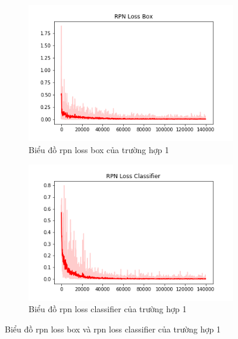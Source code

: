 \begin{center}
    \begin{figure}[H]
    \centering
    	\begin{subfigure}[H]{0.5\linewidth}
    		\centering
    		\includegraphics[width=\linewidth]{images/chap3/rpn_loss_box_2.png}
		    \caption{Biểu đồ rpn loss box của trường hợp 1}
		    \label{fig:my_label}
		\end{subfigure}\hfill
		\begin{subfigure}[H]{0.5\linewidth}
    		\centering
    		\includegraphics[width=\linewidth]{images/chap3/rpn_loss_cls_2.png}
		    \caption{Biểu đồ rpn loss classifier của trường hợp 1}
		    \label{fig:my_label}
		\end{subfigure}\hfill
	\caption{Biểu đồ rpn loss box và rpn loss classifier của trường hợp 1}
    \label{fig:mylabel}
    \end{figure}


\end{center}
